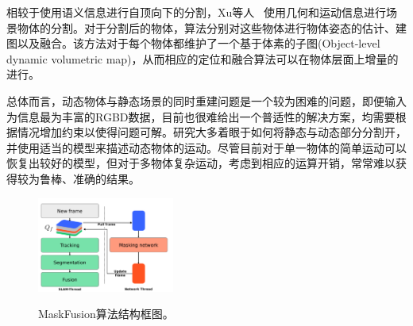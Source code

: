 相较于使用语义信息进行自顶向下的分割，Xu等人 ~\cite{2019MIDFusion}使用几何和运动信息进行场景物体的分割。对于分割后的物体，算法分别对这些物体进行物体姿态的估计、建图以及融合。该方法对于每个物体都维护了一个基于体素的子图(Object-level dynamic volumetric map)，从而相应的定位和融合算法可以在物体层面上增量的进行。

总体而言，动态物体与静态场景的同时重建问题是一个较为困难的问题，即便输入为信息最为丰富的RGBD数据，目前也很难给出一个普适性的解决方案，均需要根据情况增加约束以使得问题可解。研究大多着眼于如何将静态与动态部分分割开，并使用适当的模型来描述动态物体的运动。尽管目前对于单一物体的简单运动可以恢复出较好的模型，但对于多物体复杂运动，考虑到相应的运算开销，常常难以获得较为鲁棒、准确的结果。


\begin{figure}[htbp]
	\centering
	\includegraphics[width=0.4\textwidth]{figs/2-2/maskfusion.png} 
	\label{fig:MaskFusion-framework}
	\caption{MaskFusion算法结构框图。}
\end{figure}